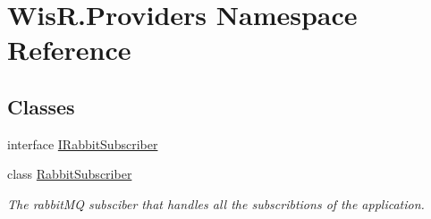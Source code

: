 \hypertarget{namespace_wis_r_1_1_providers}{}\section{Wis\+R.\+Providers Namespace Reference}
\label{namespace_wis_r_1_1_providers}
\subsection*{Classes}
\begin{DoxyCompactItemize}
\item 
interface \hyperlink{interface_wis_r_1_1_providers_1_1_i_rabbit_subscriber}{I\+Rabbit\+Subscriber}
\item 
class \hyperlink{class_wis_r_1_1_providers_1_1_rabbit_subscriber}{Rabbit\+Subscriber}
\begin{DoxyCompactList}\small\item\em The rabbit\+M\+Q subsciber that handles all the subscribtions of the application. \end{DoxyCompactList}\end{DoxyCompactItemize}
